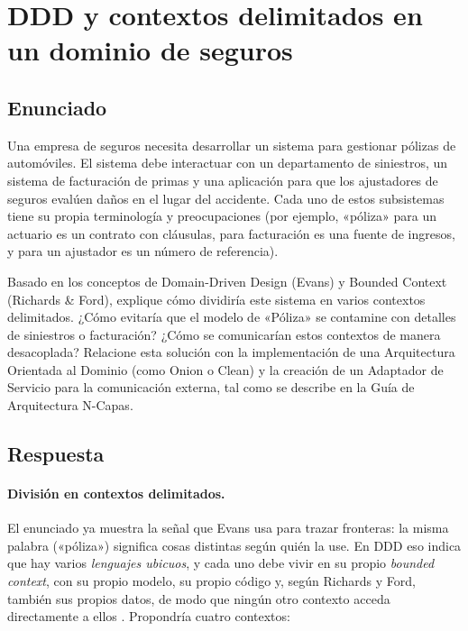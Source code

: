 \section{DDD y contextos delimitados en un dominio de seguros}

\subsection{Enunciado}
Una empresa de seguros necesita desarrollar un sistema para gestionar pólizas de automóviles. El
sistema debe interactuar con un departamento de siniestros, un sistema de facturación de primas
y una aplicación para que los ajustadores de seguros evalúen daños en el lugar del accidente.
Cada uno de estos subsistemas tiene su propia terminología y preocupaciones (por ejemplo,
«póliza» para un actuario es un contrato con cláusulas, para facturación es una fuente de
ingresos, y para un ajustador es un número de referencia).

Basado en los conceptos de Domain-Driven Design (Evans) y Bounded Context (Richards \& Ford),
explique cómo dividiría este sistema en varios contextos delimitados. ¿Cómo evitaría que el
modelo de «Póliza» se contamine con detalles de siniestros o facturación? ¿Cómo se comunicarían
estos contextos de manera desacoplada? Relacione esta solución con la implementación de una
Arquitectura Orientada al Dominio (como Onion o Clean) y la creación de un Adaptador de
Servicio para la comunicación externa, tal como se describe en la Guía de Arquitectura N-Capas.

\subsection{Respuesta}

\paragraph{División en contextos delimitados.}
El enunciado ya muestra la señal que Evans usa para trazar fronteras: la misma palabra
(«póliza») significa cosas distintas según quién la use. En DDD eso indica que hay varios
\emph{lenguajes ubicuos}, y cada uno debe vivir en su propio \emph{bounded context}, con su
propio modelo, su propio código y, según Richards y Ford, también sus propios datos, de modo que
ningún otro contexto acceda directamente a ellos \parencite{richards2020fundamentals}.
Propondría cuatro contextos:

